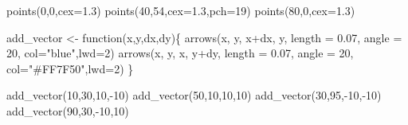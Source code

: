\documentclass[
  a4paper,
]{scrbook}
\newenvironment{Shaded}{\begin{snugshade}}{\end{snugshade}}
\newcommand{\AttributeTok}[1]{\textcolor[rgb]{0.40,0.45,0.13}{#1}}
\newcommand{\ControlFlowTok}[1]{\textcolor[rgb]{0.00,0.23,0.31}{#1}}
\newcommand{\DecValTok}[1]{\textcolor[rgb]{0.68,0.00,0.00}{#1}}
\newcommand{\FloatTok}[1]{\textcolor[rgb]{0.68,0.00,0.00}{#1}}
\newcommand{\FunctionTok}[1]{\textcolor[rgb]{0.28,0.35,0.67}{#1}}
\newcommand{\NormalTok}[1]{\textcolor[rgb]{0.00,0.23,0.31}{#1}}
\newcommand{\OtherTok}[1]{\textcolor[rgb]{0.00,0.23,0.31}{#1}}
\newcommand{\SpecialCharTok}[1]{\textcolor[rgb]{0.37,0.37,0.37}{#1}}
\newcommand{\StringTok}[1]{\textcolor[rgb]{0.13,0.47,0.30}{#1}}
\theoremstyle{definition}
\theoremstyle{remark}
\begin{document}
\begin{Shaded}
\begin{Highlighting}[]
\FunctionTok{points}\NormalTok{(}\DecValTok{0}\NormalTok{,}\DecValTok{0}\NormalTok{,}\AttributeTok{cex=}\FloatTok{1.3}\NormalTok{)}
\FunctionTok{points}\NormalTok{(}\DecValTok{40}\NormalTok{,}\DecValTok{54}\NormalTok{,}\AttributeTok{cex=}\FloatTok{1.3}\NormalTok{,}\AttributeTok{pch=}\DecValTok{19}\NormalTok{)}
\FunctionTok{points}\NormalTok{(}\DecValTok{80}\NormalTok{,}\DecValTok{0}\NormalTok{,}\AttributeTok{cex=}\FloatTok{1.3}\NormalTok{)}

\NormalTok{add\_vector }\OtherTok{\textless{}{-}} \ControlFlowTok{function}\NormalTok{(x,y,dx,dy)\{}
  \FunctionTok{arrows}\NormalTok{(x, y, x}\SpecialCharTok{+}\NormalTok{dx, y, }\AttributeTok{length =} \FloatTok{0.07}\NormalTok{, }\AttributeTok{angle =} \DecValTok{20}\NormalTok{, }\AttributeTok{col=}\StringTok{"blue"}\NormalTok{,}\AttributeTok{lwd=}\DecValTok{2}\NormalTok{)}
  \FunctionTok{arrows}\NormalTok{(x, y, x, y}\SpecialCharTok{+}\NormalTok{dy, }\AttributeTok{length =} \FloatTok{0.07}\NormalTok{, }\AttributeTok{angle =} \DecValTok{20}\NormalTok{, }\AttributeTok{col=}\StringTok{"\#FF7F50"}\NormalTok{,}\AttributeTok{lwd=}\DecValTok{2}\NormalTok{)}
\NormalTok{\}}

\FunctionTok{add\_vector}\NormalTok{(}\DecValTok{10}\NormalTok{,}\DecValTok{30}\NormalTok{,}\DecValTok{10}\NormalTok{,}\SpecialCharTok{{-}}\DecValTok{10}\NormalTok{)}
\FunctionTok{add\_vector}\NormalTok{(}\DecValTok{50}\NormalTok{,}\DecValTok{10}\NormalTok{,}\DecValTok{10}\NormalTok{,}\DecValTok{10}\NormalTok{)}
\FunctionTok{add\_vector}\NormalTok{(}\DecValTok{30}\NormalTok{,}\DecValTok{95}\NormalTok{,}\SpecialCharTok{{-}}\DecValTok{10}\NormalTok{,}\SpecialCharTok{{-}}\DecValTok{10}\NormalTok{)}
\FunctionTok{add\_vector}\NormalTok{(}\DecValTok{90}\NormalTok{,}\DecValTok{30}\NormalTok{,}\SpecialCharTok{{-}}\DecValTok{10}\NormalTok{,}\DecValTok{10}\NormalTok{)}
\end{Highlighting}
\end{Shaded}
\end{document}
